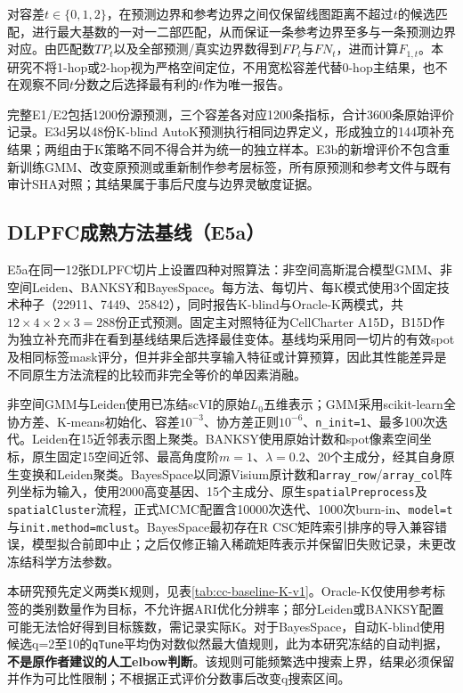 对容差$t\in\{0,1,2\}$，在预测边界和参考边界之间仅保留线图距离不超过$t$的候选匹配，进行最大基数的一对一二部匹配，从而保证一条参考边界至多与一条预测边界对应。由匹配数$TP_t$以及全部预测/真实边界数得到$FP_t$与$FN_t$，进而计算$F_{1,t}$。本研究不将1-hop或2-hop视为严格空间定位，不用宽松容差代替0-hop主结果，也不在观察不同$t$分数之后选择最有利的$t$作为唯一报告。

完整E1/E2包括1200份源预测，三个容差各对应1200条指标，合计3600条原始评价记录。E3d另以48份K-blind AutoK预测执行相同边界定义，形成独立的144项补充结果；两组由于K策略不同不得合并为统一的独立样本。E3b的新增评价不包含重新训练GMM、改变原预测或重新制作参考层标签，所有原预测和参考文件与既有审计SHA对照；其结果属于事后尺度与边界灵敏度证据。

\subsection{DLPFC成熟方法基线（E5a）}
\label{subsec:cc-e5a-v1}

E5a在同一12张DLPFC切片上设置四种对照算法：非空间高斯混合模型GMM、非空间Leiden、BANKSY和BayesSpace。每方法、每切片、每K模式使用3个固定技术种子（22911、7449、25842），同时报告K-blind与Oracle-K两模式，共$12\times4\times2\times3=288$份正式预测。固定主对照特征为CellCharter A15D，B15D作为独立补充而非在看到基线结果后选择最佳变体。基线均采用同一切片的有效spot及相同标签mask评分，但并非全部共享输入特征或计算预算，因此其性能差异是不同原生方法流程的比较而非完全等价的单因素消融。

非空间GMM与Leiden使用已冻结scVI的原始$L_0$五维表示；GMM采用scikit-learn全协方差、K-means初始化、容差$10^{-3}$、协方差正则$10^{-6}$、\texttt{n\_init=1}、最多100次迭代。Leiden在15近邻表示图上聚类。BANKSY使用原始计数和spot像素空间坐标，原生固定15空间近邻、最高角度阶$m=1$、$\lambda=0.2$、20个主成分，经其自身原生变换和Leiden聚类。BayesSpace以同源Visium原计数和\texttt{array\_row}/\texttt{array\_col}阵列坐标为输入，使用2000高变基因、15个主成分、原生\texttt{spatialPreprocess}及\texttt{spatialCluster}流程，正式MCMC配置含10000次迭代、1000次burn-in、\texttt{model=t}与\texttt{init.method=mclust}。BayesSpace最初存在R CSC矩阵索引排序的导入兼容错误，模型拟合前即中止；之后仅修正输入稀疏矩阵表示并保留旧失败记录，未更改冻结科学方法参数。

本研究预先定义两类K规则，见表\ref{tab:cc-baseline-K-v1}。Oracle-K仅使用参考标签的类别数量作为目标，不允许据ARI优化分辨率；部分Leiden或BANKSY配置可能无法恰好得到目标簇数，需记录实际K。对于BayesSpace，自动K-blind使用候选q=2至10的\texttt{qTune}平均伪对数似然最大值规则，此为本研究冻结的自动判据，\textbf{不是原作者建议的人工elbow判断}。该规则可能频繁选中搜索上界，结果必须保留并作为可比性限制；不根据正式评价分数事后改变q搜索区间。

